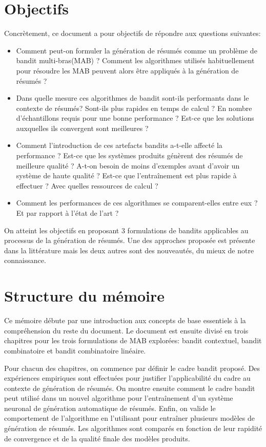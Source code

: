\section*{Objectifs}

Concrètement, ce document a pour objectifs de répondre aux questions suivantes:

\begin{itemize}
      \item Comment peut-on formuler la génération de résumés comme un problème de bandit multi-bras(MAB) ?
            Comment les algorithmes utilisés habituellement pour résoudre les MAB peuvent
            alors être appliqués à la génération de résumés ?
      \item Dans quelle mesure ces algorithmes de bandit sont-ils performants dans le contexte de résumés?
            Sont-ils plus rapides en temps de calcul ? En nombre d'échantillons requis pour une
            bonne performance ? Est-ce que les solutions auxquelles ils convergent sont meilleures ?
      \item Comment l'introduction de ces artefacts bandits a-t-elle affecté la performance ?
            Est-ce que les systèmes produits génèrent des résumés de meilleure qualité ?
            A-t-on besoin de moins d'exemples avant d'avoir un système de haute qualité ?
            Est-ce que l'entraînement est plus rapide à effectuer ? Avec quelles ressources de calcul ?
      \item Comment les performances de ces algorithmes se comparent-elles entre eux ? Et par rapport à l'état de l'art ?
\end{itemize}

On atteint les objectifs en proposant 3 formulations de bandits applicables au processus
de la génération de résumés.
Une des approches proposée est présente dans la littérature mais les deux autres sont
des nouveautés, du mieux de notre connaissance.

\section*{Structure du mémoire}

Ce mémoire débute par une introduction aux concepts de base essentiels à la compréhension
du reste du document.
Le document est ensuite divisé en trois chapitres pour les trois formulations de MAB explorées:
bandit contextuel, bandit combinatoire et bandit combinatoire linéaire.

Pour chacun des chapitres, on commence par définir le cadre bandit proposé.
Des expériences empiriques sont effectuées pour justifier l'applicabilité
du cadre au contexte de génération de résumés.
On montre ensuite comment le cadre bandit peut utilisé dans un nouvel algorithme
pour l'entraînement d'un système neuronal de génération automatique de résumés.
Enfin, on valide le comportement de l'algorithme en l'utilisant pour
entraîner plusieurs modèles de génération de résumés.
Les algorithmes sont comparés en fonction de leur rapidité de convergence et
de la qualité finale des modèles produits.